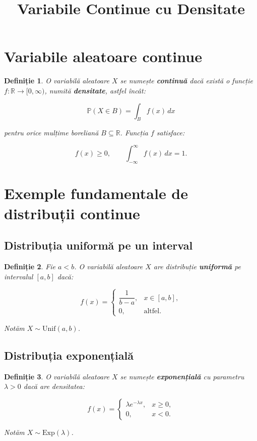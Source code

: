 \documentclass[12pt]{article}
\title{Variabile Continue cu Densitate}
\author{}
\date{}
\theoremstyle{plain}
\newtheorem{definition}{Definiție}
\begin{document}
\maketitle

\section{Variabile aleatoare continue}

\begin{definition}
O variabilă aleatoare $X$ se numește \textbf{continuă} dacă există o funcție
$f : \mathbb{R} \to [0,\infty)$, numită \textbf{densitate}, astfel încât:


\[
\mathbb{P}(X \in B) = \int_B f(x)\, dx
\]


pentru orice mulțime boreliană $B \subseteq \mathbb{R}$.
Funcția $f$ satisface:


\[
f(x) \ge 0, \qquad \int_{-\infty}^{\infty} f(x)\, dx = 1.
\]


\end{definition}

\section{Exemple fundamentale de distribuții continue}

\subsection{Distribuția uniformă pe un interval}

\begin{definition}
Fie $a < b$. O variabilă aleatoare $X$ are distribuție \textbf{uniformă} pe intervalul $[a,b]$ dacă:


\[
f(x) =
\begin{cases}
\dfrac{1}{b-a}, & x \in [a,b], \\[12pt]
0, & \text{altfel}.
\end{cases}
\]


Notăm $X \sim \mathrm{Unif}(a,b)$.
\end{definition}

\subsection{Distribuția exponențială}

\begin{definition}
O variabilă aleatoare $X$ se numește \textbf{exponențială} cu parametru $\lambda > 0$ dacă are densitatea:


\[
f(x) =
\begin{cases}
\lambda e^{-\lambda x}, & x \ge 0,\\
0, & x < 0.
\end{cases}
\]


Notăm $X \sim \mathrm{Exp}(\lambda)$.
\end{definition}
\end{document}

